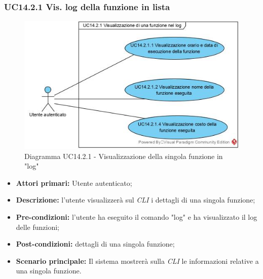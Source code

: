 \subsubsection{UC14.2.1 Vis. log della funzione in lista}
\begin{figure}[h]
	\centering
	\includegraphics[width=0.7\linewidth]{res/img/UC14.2.1senzaFirma.jpg}
	\caption{Diagramma UC14.2.1 - Visualizzazione della singola funzione in "log"}
\end{figure}
\begin{itemize}
	\item \textbf{Attori primari:} Utente autenticato;
	\item \textbf{Descrizione:} l'utente visualizzerà sul \textit{CLI\glo} i dettagli di una singola funzione;
	\item \textbf{Pre-condizioni:} l'utente ha eseguito il comando "log" e ha visualizzato il log delle funzioni;
	\item \textbf{Post-condizioni:} dettagli di una singola funzione;
	\item \textbf{Scenario principale:} Il sistema mostrerà sulla \textit{CLI\glo} le informazioni relative a una singola funzione.
\end{itemize}
